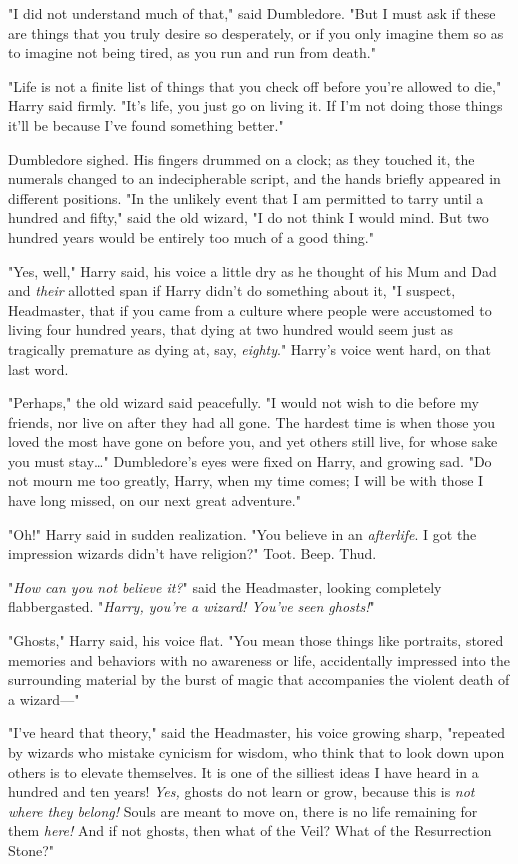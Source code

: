 "I did not understand much of that," said Dumbledore. "But I must ask if these 
are things that you truly desire so desperately, or if you only imagine them so 
as to imagine not being tired, as you run and run from death."

"Life is not a finite list of things that you check off before you're allowed 
to die," Harry said firmly. "It's life, you just go on living it. If I'm not 
doing those things it'll be because I've found something better."

Dumbledore sighed. His fingers drummed on a clock; as they touched it, the 
numerals changed to an indecipherable script, and the hands briefly appeared in 
different positions. "In the unlikely event that I am permitted to tarry until 
a hundred and fifty," said the old wizard, "I do not think I would mind. But 
two hundred years would be entirely too much of a good thing."

"Yes, well," Harry said, his voice a little dry as he thought of his Mum and 
Dad and \emph{their} allotted span if Harry didn't do something about it, "I 
suspect, Headmaster, that if you came from a culture where people were 
accustomed to living four hundred years, that dying at two hundred would seem 
just as tragically premature as dying at, say, \emph{eighty}." Harry's voice 
went hard, on that last word.

"Perhaps," the old wizard said peacefully. "I would not wish to die before my 
friends, nor live on after they had all gone. The hardest time is when those 
you loved the most have gone on before you, and yet others still live, for 
whose sake you must stay{\ldots}" Dumbledore's eyes were fixed on Harry, and 
growing sad. "Do not mourn me too greatly, Harry, when my time comes; I will be 
with those I have long missed, on our next great adventure."

"Oh!" Harry said in sudden realization. "You believe in an \emph{afterlife}. I 
got the impression wizards didn't have religion?"
\sbreak
Toot. Beep. Thud.

"\emph{How can you not believe it?}" said the Headmaster, looking completely 
flabbergasted. "\emph{Harry, you're a wizard! You've seen ghosts!}"

"Ghosts," Harry said, his voice flat. "You mean those things like portraits, 
stored memories and behaviors with no awareness or life, accidentally impressed 
into the surrounding material by the burst of magic that accompanies the 
violent death of a wizard---"

"I've heard that theory," said the Headmaster, his voice growing sharp, 
"repeated by wizards who mistake cynicism for wisdom, who think that to look 
down upon others is to elevate themselves. It is one of the silliest ideas I 
have heard in a hundred and ten years! \emph{Yes,} ghosts do not learn or grow, 
because this is \emph{not where they belong!} Souls are meant to move on, there 
is no life remaining for them \emph{here!} And if not ghosts, then what of the 
Veil? What of the Resurrection Stone?"

